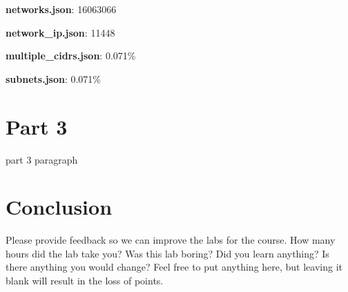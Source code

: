 \documentclass[11pt]{article}
\begin{document}
\textbf{networks.json}: 16063066

\textbf{network\_ip.json}: 11448

\textbf{multiple\_cidrs.json}: 0.071\%

\textbf{subnets.json}: 0.071\%

\section*{Part 3}
\label{sec:part-3}
part 3 paragraph

\section*{Conclusion}
\label{sec:conclusion}
Please provide feedback so we can improve the labs for the course. How many
hours did the lab take you? Was this lab boring? Did you learn anything? Is
there anything you would change? Feel free to put anything here, but leaving it
blank will result in the loss of points.

\nocite{*}


\end{document}
